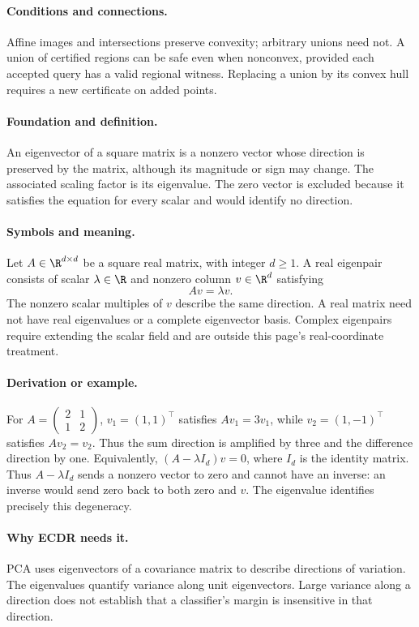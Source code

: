 \paragraph{Conditions and connections.}
Affine images and intersections preserve convexity; arbitrary unions
need not. A union of certified regions can be safe even when nonconvex,
provided each accepted query has a valid regional witness. Replacing a
union by its convex hull requires a new certificate on added points.

\paragraph{Foundation and definition.}
An eigenvector of a square matrix is a nonzero vector whose direction
is preserved by the matrix, although its magnitude or sign may change.
The associated scaling factor is its eigenvalue. The zero vector is
excluded because it satisfies the equation for every scalar and would
identify no direction.
\paragraph{Symbols and meaning.}
Let $A\in\R^{d\times d}$ be a square real matrix, with integer
$d\ge1$. A real eigenpair consists of scalar $\lambda\in\R$ and
nonzero column $v\in\R^d$ satisfying
\[
 Av=\lambda v.
\]
The nonzero scalar multiples of $v$ describe the same direction. A real
matrix need not have real eigenvalues or a complete eigenvector basis.
Complex eigenpairs require extending the scalar field and are outside
this page's real-coordinate treatment.
\paragraph{Derivation or example.}
For $A=\begin{pmatrix}2&1\\1&2\end{pmatrix}$,
$v_1=(1,1)^\top$ satisfies $Av_1=3v_1$, while
$v_2=(1,-1)^\top$ satisfies $Av_2=v_2$. Thus the sum direction is
amplified by three and the difference direction by one.
Equivalently, $(A-\lambda I_d)v=0$, where $I_d$ is the identity
matrix. Thus $A-\lambda I_d$ sends a nonzero vector to zero and
cannot have an inverse: an inverse would send zero back to both zero
and $v$. The eigenvalue identifies precisely this degeneracy.
\paragraph{Why ECDR needs it.}
PCA uses eigenvectors of a covariance matrix to describe directions of
variation. The eigenvalues quantify variance along unit eigenvectors.
Large variance along a direction does not establish that a classifier's
margin is insensitive in that direction.
